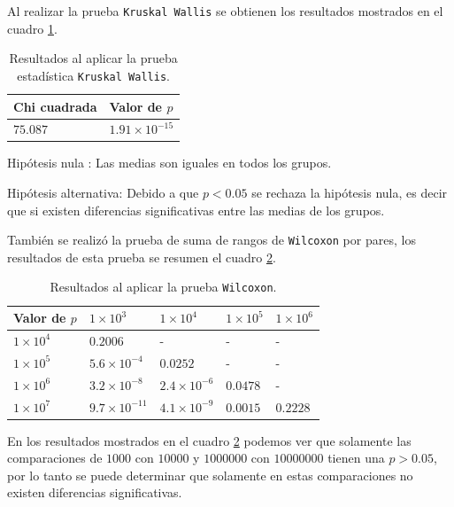 \documentclass{article}
\begin{document}
Al realizar la prueba \texttt{Kruskal Wallis} se obtienen los resultados mostrados en el cuadro \ref{Cuadro5}. 
\bigskip

\begin{table}[ht]
\centering
\caption{Resultados al aplicar la prueba estadística \texttt{Kruskal Wallis}.}
\smallskip

\begin{tabular}{ |p{2.1cm}|p{2.1cm}|}
 \hline
 Chi cuadrada & Valor de $p$ \\
 \hline
 $75.087$ & $1.91\times 10^{-15}$ \\
 \hline
\end{tabular}
\label{Cuadro5}
\end{table}

Hipótesis nula : Las medias son iguales en todos los grupos.
\smallskip

Hipótesis alternativa: Debido a que $p < 0.05$ se rechaza la hipótesis nula, es decir que si existen diferencias significativas entre las medias de los grupos. 
\bigskip

También se realizó la prueba de suma de rangos de \texttt{Wilcoxon} por pares, los resultados de esta prueba se resumen el cuadro \ref{Cuadro6}.

\newpage

\begin{table}[ht]
\centering
\caption{Resultados al aplicar la prueba \texttt{Wilcoxon}.}
\smallskip

\begin{tabular}{ |p{2.1cm}|p{2.1cm}|p{2.1cm}|p{2.1cm}|p{2.1cm}|}
 \hline
Valor de $p$ & $1\times 10^{3}$ & $1\times 10^{4}$ & $1\times 10^{5}$ & $1\times 10^{6}$\\
 \hline
 $1\times 10^{4}$ & $0.2006$ & - & - & - \\
 \hline
  $1\times 10^{5}$ & $5.6\times 10^{-4}$ & $0.0252$ & - & -\\
 \hline
  $1\times 10^{6}$ & $3.2\times 10^{-8}$ & $2.4\times 10^{-6}$ & $0.0478$ & - \\
 \hline
  $1\times 10^{7}$ & $9.7\times 10^{-11}$ & $4.1\times 10^{-9}$ & $0.0015$ & $0.2228$ \\
 \hline
\end{tabular}
\label{Cuadro6}
\end{table}

En los resultados mostrados en el cuadro \ref{Cuadro6} podemos ver que solamente las comparaciones de $1000$ con $10000$ y $1000000$ con $10000000$ tienen una $p > 0.05$, por lo tanto se puede determinar que solamente en estas comparaciones no existen diferencias significativas.
\bigskip
\end{document}
